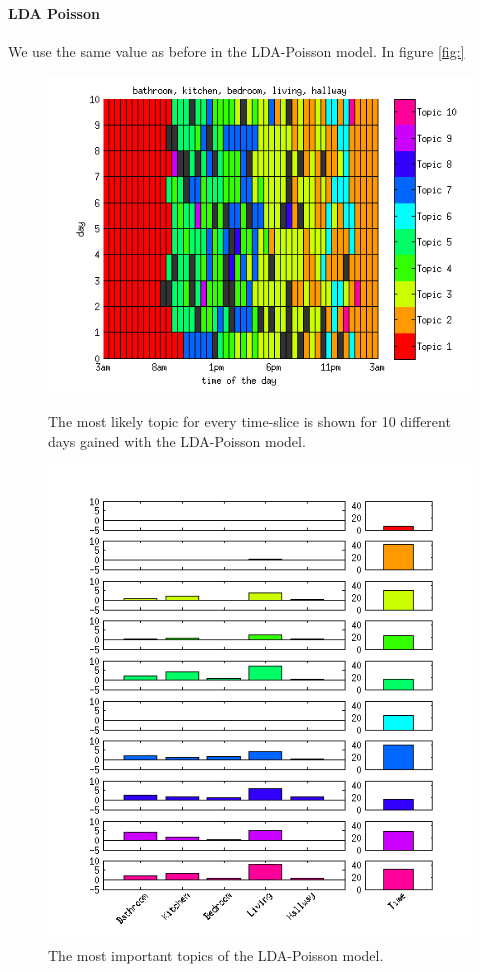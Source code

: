 \documentclass[11pt,a4paper]{article}
\begin{document}
\paragraph{LDA Poisson}
We use the same value as before in the LDA-Poisson model. In figure \ref{fig:}

\begin{figure}[h]
 \centering
 \begin{minipage}{0.45\linewidth}
 \centering
 \includegraphics[width=\textwidth]{Pictures/TopDayPois.png}
 \caption{The most likely topic for every time-slice is shown for 10 different days gained with the LDA-Poisson model.}
 \label{fig:TopicVisu}
 \end{minipage}
 \begin{minipage}{0.45\linewidth}
 \centering
 \includegraphics[width=\textwidth]{Pictures/TopBarPois.png}
 \caption{The most important topics of the LDA-Poisson model.}
 \label{fig:TopBarGaus}
 \end{minipage}
\end{figure}
\end{document}
